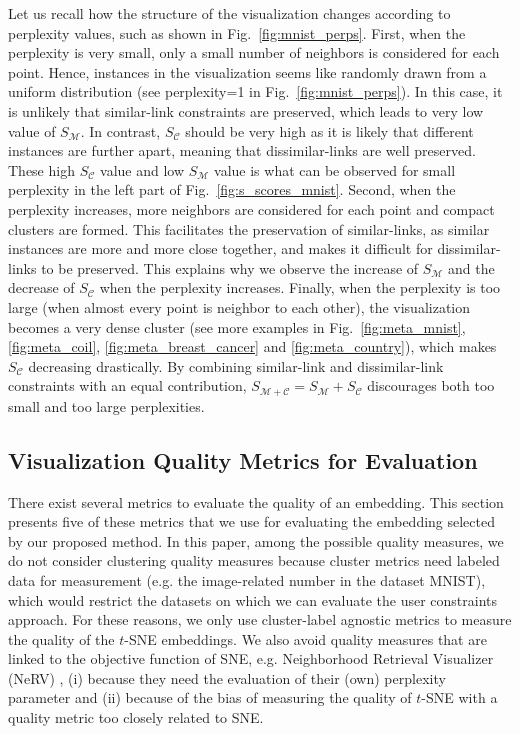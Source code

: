 Let us recall how the structure of the visualization changes according to perplexity values, such as shown in Fig.~\ref{fig:mnist_perps}.
First, when the perplexity is very small, only a small number of neighbors is considered for each point. Hence, instances in the visualization seems like randomly drawn from a uniform distribution (see perplexity=1 in Fig.~\ref{fig:mnist_perps}). In this case, it is unlikely that similar-link constraints are preserved, which leads to very low value of $S_{\mathcal{M}}$. In contrast, $S_{\mathcal{C}}$ should be very high as it is likely that different instances are further apart, meaning that dissimilar-links are well preserved. These high $S_{\mathcal{C}}$ value and low $S_{\mathcal{M}}$ value is what can be observed for small perplexity in the left part of Fig.~\ref{fig:s_scores_mnist}.
Second, when the perplexity increases, more neighbors are considered for each point and compact clusters are formed. This facilitates the preservation of similar-links, as similar instances are more and more close together, and makes it difficult for dissimilar-links to be preserved.
This explains why we observe the increase of $S_{\mathcal{M}}$ and the decrease of $S_{\mathcal{C}}$ when the perplexity increases.
Finally, when the perplexity is too large (when almost every point is neighbor to each other), the visualization becomes a very dense cluster (see more examples in Fig.~\ref{fig:meta_mnist}, \ref{fig:meta_coil}, \ref{fig:meta_breast_cancer} and \ref{fig:meta_country}), which makes $S_{\mathcal{C}}$ decreasing drastically.
By combining similar-link and dissimilar-link constraints with an equal contribution, $S_{\mathcal{M}+\mathcal{C}} = S_{\mathcal{M}} + S_{\mathcal{C}}$ discourages both too small and too large perplexities.

\subsection{Visualization Quality Metrics for Evaluation}\label{subsec:metric}
There exist several metrics to evaluate the quality of an embedding. This section presents five of these metrics that we use for evaluating the embedding selected by our proposed method. 
In this paper, among the possible quality measures, we do not consider clustering quality measures because cluster metrics need labeled data for measurement (e.g. the image-related number in the dataset MNIST), which would restrict the datasets on which we can evaluate the user constraints approach.
For these reasons, we only use cluster-label agnostic metrics to measure the quality of the $t$-SNE embeddings.
We also avoid quality measures that are linked to the objective function of SNE, e.g. Neighborhood Retrieval Visualizer (NeRV) \cite{venna2010}, (i) because they need the evaluation of their (own) perplexity parameter and (ii) because of the bias of measuring the quality of $t$-SNE with a quality metric too closely related to SNE.

